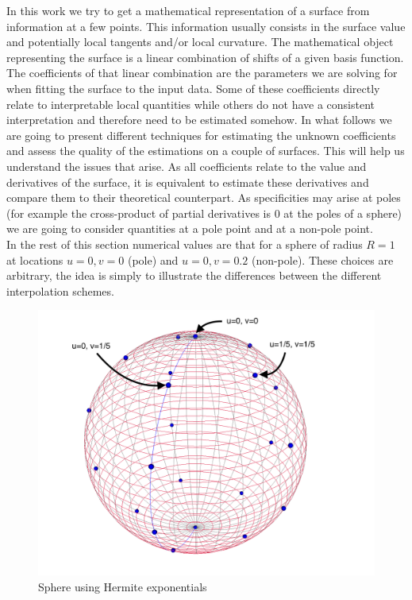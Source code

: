 \documentclass[a4paper, 11pt]{article}
\begin{document}
In this work we try to get a mathematical representation of a surface from information at a few points. This information 
usually consists in the surface value and potentially local tangents and/or local curvature. The mathematical object 
representing the surface is a linear combination of shifts of a given basis function. The coefficients of that linear 
combination are the parameters we are solving for when fitting the surface to the input data. Some of these coefficients 
directly relate to interpretable local quantities while others do not have a consistent interpretation and therefore 
need to be estimated somehow. In what follows we are going to present different techniques for estimating the unknown 
coefficients and assess the quality of the estimations on a couple of surfaces. This will help us understand the issues 
that arise. As all coefficients relate to the value and derivatives of the surface, it is equivalent to estimate these 
derivatives and compare them to their theoretical counterpart. As specificities may arise at poles (for example the 
cross-product of partial derivatives is 0 at the poles of a sphere) we are going to consider quantities at a pole point 
and at a non-pole point.  \\

In the rest of this section numerical values are that for a sphere of radius $R=1$ at locations $u=0, v=0$ (pole) and 
$u=0, v=0.2$ (non-pole). These choices are arbitrary, the idea is simply to illustrate the differences between the 
different interpolation schemes. 

\begin{figure}[h!]
  \includegraphics[width=16cm]{sphere_5_5_conti.png}
  \caption{Sphere using Hermite exponentials}
\end{figure}
\end{document}
